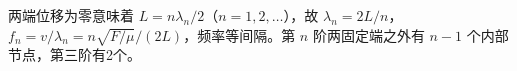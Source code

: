 两端位移为零意味着 $L=n\lambda_n/2$（$n=1,2,\dots$），故 $\lambda_n=2L/n$，$f_n=v/\lambda_n=n\sqrt{F/\mu}/(2L)$，频率等间隔。第 $n$ 阶两固定端之外有 $n-1$ 个内部节点，第三阶有2个。
